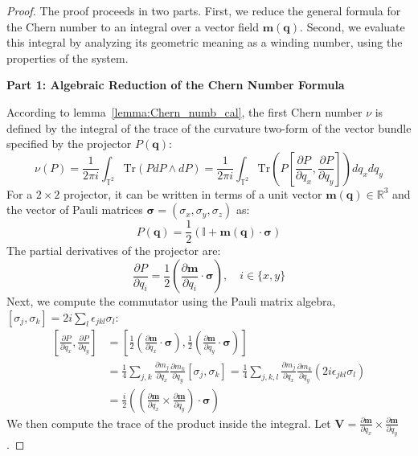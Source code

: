 \begin{proof}
The proof proceeds in two parts. First, we reduce the general formula for the Chern number to an integral over a vector field $\mathbf{m}(\mathbf{q})$. Second, we evaluate this integral by analyzing its geometric meaning as a winding number, using the properties of the system.

\textbf{Part 1: Algebraic Reduction of the Chern Number Formula}

According to lemma~\ref{lemma:Chern_numb_cal}, the first Chern number $\nu$ is defined by the integral of the trace of the curvature two-form of the vector bundle specified by the projector $P(\mathbf{q})$:
\begin{equation}
\nu(P) = \frac{1}{2\pi i} \int_{\mathbb{T}^2} \text{Tr}\left(P dP \wedge dP\right) = \frac{1}{2\pi i} \int_{\mathbb{T}^2} \text{Tr}\left( P \left[ \frac{\partial P}{\partial q_x}, \frac{\partial P}{\partial q_y} \right] \right) dq_x dq_y
\label{eq:chern_def}
\end{equation}
For a $2 \times 2$ projector, it can be written in terms of a unit vector $\mathbf{m}(\mathbf{q}) \in \mathbb{R}^3$ and the vector of Pauli matrices $\boldsymbol{\sigma} = (\sigma_x, \sigma_y, \sigma_z)$ as:
$$P(\mathbf{q}) = \frac{1}{2}(\mathbb{I} + \mathbf{m}(\mathbf{q}) \cdot \boldsymbol{\sigma})$$
The partial derivatives of the projector are:
$$\frac{\partial P}{\partial q_i} = \frac{1}{2}\left(\frac{\partial \mathbf{m}}{\partial q_i} \cdot \boldsymbol{\sigma}\right), \quad i \in \{x, y\}$$
Next, we compute the commutator using the Pauli matrix algebra, $[\sigma_j, \sigma_k] = 2i \sum_l \epsilon_{jkl} \sigma_l$:
\begin{align*}
\left[ \frac{\partial P}{\partial q_x}, \frac{\partial P}{\partial q_y} \right] &= \left[ \frac{1}{2} \left(\frac{\partial \mathbf{m}}{\partial q_x} \cdot \boldsymbol{\sigma}\right), \frac{1}{2} \left(\frac{\partial \mathbf{m}}{\partial q_y} \cdot \boldsymbol{\sigma}\right) \right] \\
&= \frac{1}{4} \sum_{j,k} \frac{\partial m_j}{\partial q_x} \frac{\partial m_k}{\partial q_y} [\sigma_j, \sigma_k] = \frac{1}{4} \sum_{j,k,l} \frac{\partial m_j}{\partial q_x} \frac{\partial m_k}{\partial q_y} (2i \epsilon_{jkl} \sigma_l) \\
&= \frac{i}{2} \left( \left( \frac{\partial \mathbf{m}}{\partial q_x} \times \frac{\partial \mathbf{m}}{\partial q_y} \right) \cdot \boldsymbol{\sigma} \right)
\end{align*}
We then compute the trace of the product inside the integral. Let $\mathbf{V} = \frac{\partial \mathbf{m}}{\partial q_x} \times \frac{\partial \mathbf{m}}{\partial q_y}$.

\end{proof}

